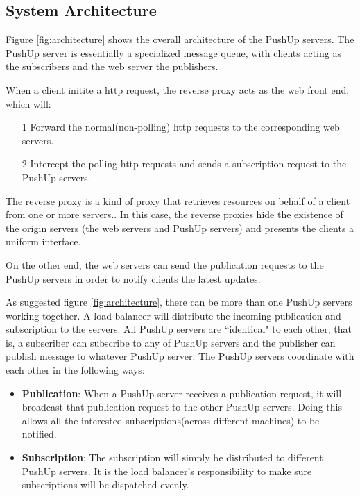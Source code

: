\subsection{System Architecture\\}

Figure \ref{fig:architecture} shows the overall architecture of the PushUp servers.
The PushUp server is essentially a specialized message queue, with clients 
acting as the subscribers and the web server the publishers.

When a client initite a http request, the reverse proxy acts as the web front end,
which will: 
\begin{itemize}
    \item[1] Forward the normal(non-polling) http requests to the corresponding 
             web servers.
    \item[2] Intercept the polling http requests and sends a subscription request to 
             the PushUp servers.
\end{itemize}

The reverse proxy is a kind of proxy that retrieves
resources on behalf of a client from one or more 
servers.\cite{ReverseProxy}. In this case, the reverse
proxies hide the existence of the origin servers (the 
web servers and PushUp servers) and presents the clients
a uniform interface.

On the other end, the web servers can send the publication requests to the 
PushUp servers in order to notify clients the latest updates.

As suggested figure \ref{fig:architecture}, there can be more than one PushUp 
servers working together. A load balancer will distribute the incoming publication 
and subscription to the servers. All PushUp servers are ``identical" to each other,
that is, a subscriber can subscribe to any of PushUp servers and the publisher can 
publish message to whatever PushUp server. The PushUp servers coordinate with each
other in the following ways:

\begin{itemize}
    \item {\bf Publication}: When a PushUp server receives a publication request, it
          will broadcast that publication request to the other PushUp servers. Doing
          this allows all the interested subscriptions(across different machines) to 
          be notified.
    \item {\bf Subscription}: The subscription will simply be distributed to different
          PushUp servers. It is the load balancer's responsibility to make sure 
          subscriptions will be dispatched evenly.
\end{itemize}


